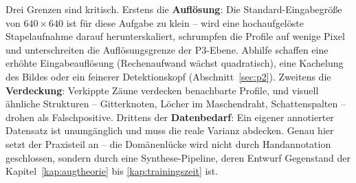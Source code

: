 Drei Grenzen sind kritisch. Erstens die \textbf{Auflösung}: Die
Standard-Eingabegröße von $640\times640$ ist für diese Aufgabe zu klein -- wird
eine hochaufgelöste Stapelaufnahme darauf herunterskaliert, schrumpfen die
Profile auf wenige Pixel und unterschreiten die Auflösungsgrenze der P3-Ebene.
Abhilfe schaffen eine erhöhte Eingabeauflösung (Rechenaufwand wächst
quadratisch), eine Kachelung des Bildes \parencite{akyon2022sahi} oder ein
feinerer Detektionskopf (Abschnitt~\ref{sec:p2}). Zweitens die
\textbf{Verdeckung}: Verkippte Zäune verdecken benachbarte Profile, und visuell
ähnliche Strukturen -- Gitterknoten, Löcher im Maschendraht, Schattenspalten --
drohen als Falschpositive. Drittens der \textbf{Datenbedarf}: Ein eigener
annotierter Datensatz ist unumgänglich und muss die reale Varianz abdecken. Genau
hier setzt der Praxisteil an -- die Domänenlücke wird nicht durch Handannotation
geschlossen, sondern durch eine Synthese-Pipeline, deren Entwurf Gegenstand der
Kapitel~\ref{kap:augtheorie} bis \ref{kap:trainingszeit} ist.

